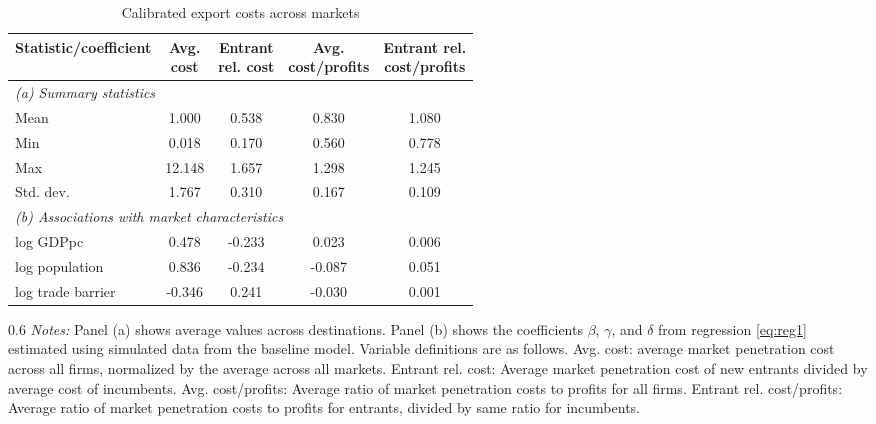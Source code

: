 \begin{table}[h!]
\footnotesize
\renewcommand{\arraystretch}{1.2}
\begin{center}
\caption{Calibrated export costs across markets}
\label{tab:sumstats_regs_costs}
\begin{tabular}{lcccc}\toprule
Statistic/coefficient& \makecell{Avg.\\cost}& \makecell{Entrant\\rel. cost}& \makecell{Avg.\\cost/profits}& \makecell{Entrant rel.\\ cost/profits}\\
\midrule
\multicolumn{5}{l}{\textit{(a) Summary statistics}}\\[4pt]
Mean& 1.000& 0.538& 0.830& 1.080\\
Min& 0.018& 0.170& 0.560& 0.778\\
Max& 12.148& 1.657& 1.298& 1.245\\
Std. dev.& 1.767& 0.310& 0.167& 0.109\\
\midrule\multicolumn{5}{l}{\textit{(b) Associations with market characteristics}}\\[4pt]
log GDPpc& 0.478& -0.233& 0.023& 0.006\\
log population& 0.836& -0.234& -0.087& 0.051\\
log trade barrier& -0.346& 0.241& -0.030& 0.001\\
\bottomrule
\end{tabular}
\begin{fignote2}{0.6\textwidth}
\textit{Notes:} Panel (a) shows average values across destinations. Panel (b) shows the coefficients $\beta$, $\gamma$, and $\delta$ from regression \eqref{eq:reg1} estimated using simulated data from the baseline model.  Variable definitions are as follows. Avg. cost: average market penetration cost across all firms, normalized by the average across all markets. Entrant rel. cost: Average market penetration cost of new entrants divided by average cost of incumbents. Avg. cost/profits: Average ratio of market penetration costs to profits for all firms. Entrant rel. cost/profits: Average ratio of market penetration costs to profits for entrants, divided by same ratio for incumbents.
\end{fignote2}
\end{center}
\normalsize
\end{table}
